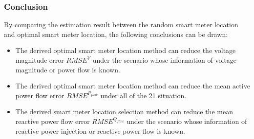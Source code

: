 \subsubsection{Conclusion}
By comparing the estimation result between the random smart meter location and optimal smart meter location, the following conclusions can be drawn:
\begin{itemize}
    \item The derived optimal smart meter location method can reduce the voltage magnitude error $RMSE^V$ under the scenario whose information of voltage magnitude or power flow is known.
    \item The derived optimal smart meter location method can reduce the mean active power flow error $RMSE^{P_{flow}}$ under all of the 21 situation.
    \item The derived smart meter location selection method can reduce the mean reactive power flow error $RMSE^{Q_{flow}}$ under the scenario whose information of reactive power injection or reactive power flow is known.
\end{itemize}
